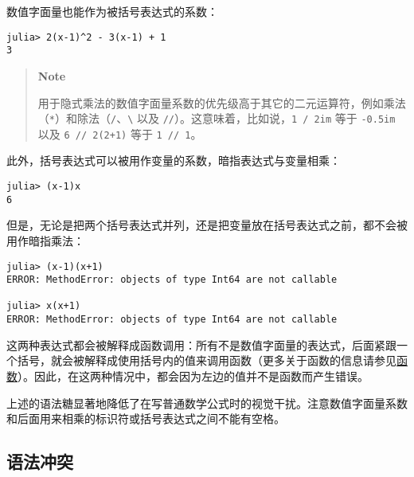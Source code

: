 数值字面量也能作为被括号表达式的系数：




\begin{verbatim}
julia> 2(x-1)^2 - 3(x-1) + 1
3
\end{verbatim}



\begin{quote}
\textbf{Note}

用于隐式乘法的数值字面量系数的优先级高于其它的二元运算符，例如乘法（\texttt{*}）和除法（\texttt{/}、\texttt{{\textbackslash}} 以及 \texttt{//}）。这意味着，比如说，\texttt{1 / 2im} 等于 \texttt{-0.5im} 以及 \texttt{6 // 2(2+1)} 等于 \texttt{1 // 1}。

\end{quote}


此外，括号表达式可以被用作变量的系数，暗指表达式与变量相乘：




\begin{verbatim}
julia> (x-1)x
6
\end{verbatim}



但是，无论是把两个括号表达式并列，还是把变量放在括号表达式之前，都不会被用作暗指乘法：




\begin{verbatim}
julia> (x-1)(x+1)
ERROR: MethodError: objects of type Int64 are not callable

julia> x(x+1)
ERROR: MethodError: objects of type Int64 are not callable
\end{verbatim}



这两种表达式都会被解释成函数调用：所有不是数值字面量的表达式，后面紧跟一个括号，就会被解释成使用括号内的值来调用函数（更多关于函数的信息请参见\hyperlink{16900494992832782120}{函数}）。因此，在这两种情况中，都会因为左边的值并不是函数而产生错误。



上述的语法糖显著地降低了在写普通数学公式时的视觉干扰。注意数值字面量系数和后面用来相乘的标识符或括号表达式之间不能有空格。



\hypertarget{5522643503764211248}{}


\subsection{语法冲突}




